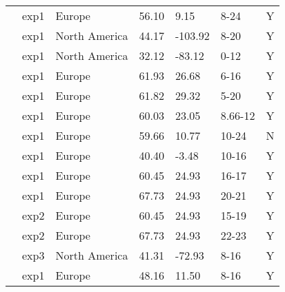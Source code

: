 \documentclass{article}
\begin{document}
\begin{footnotesize}
\begin{table}[ht]
\begin{tabular}{|p{}|p{}|p{}|p{}|p{}|p{}|p{}|}
  \citet{Myking:1995} & exp1 & Europe & 56.10 & 9.15 & 8-24 & Y \\ 
  \citet{Nienstaedt:1966aa} & exp1 & North America & 44.17 & -103.92 & 8-20 & Y \\ 
  \citet{Okie:2011aa} & exp1 & North America & 32.12 & -83.12 & 0-12 & Y \\ 
  \citet{Partanen:2001aa} & exp1 & Europe & 61.93 & 26.68 & 6-16 & Y \\ 
  \citet{Partanen:2005aa} & exp1 & Europe & 61.82 & 29.32 & 5-20 & Y \\ 
  \citet{Partanen:1998aa} & exp1 & Europe & 60.03 & 23.05 & 8.66-12 & Y \\ 
  \citet{Pettersen:1972aa} & exp1 & Europe & 59.66 & 10.77 & 10-24 & N \\ 
  \citet{Sanz-Perez:2009aa} & exp1 & Europe & 40.40 & -3.48 & 10-16 & Y \\ 
  \citet{Vihera-Aarnio:2006aa} & exp1 & Europe & 60.45 & 24.93 & 16-17 & Y \\ 
  \citet{Vihera-Aarnio:2006aa} & exp1 & Europe & 67.73 & 24.93 & 20-21 & Y \\ 
  \citet{Vihera-Aarnio:2006aa} & exp2 & Europe & 60.45 & 24.93 & 15-19 & Y \\ 
  \citet{Vihera-Aarnio:2006aa} & exp2 & Europe & 67.73 & 24.93 & 22-23 & Y \\ 
  \citet{Worrall:1967aa} & exp3 & North America & 41.31 & -72.93 & 8-16 & Y \\ 
  \citet{zohner2016} & exp1 & Europe & 48.16 & 11.50 & 8-16 & Y \\ 
   \hline
\end{tabular}
\endgroup
\end{table}\end{footnotesize} 
\end{document}
